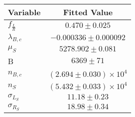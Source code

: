 \begin{tabular}[t]{lc}
\hline
Variable &Fitted Value\\
\hline\hline
$f_{\frac{L}{R}}$&$0.470\pm0.025$\\
\hline
$\lambda_{B,c}$&$-0.000336\pm0.000092$\\
\hline
$\mu_S$&$5278.902\pm0.081$\\
\hline
B&$6369\pm71$\\
\hline
$n_{B,c}$&$(2.694\pm0.030)\times 10^4$\\
\hline
$n_S$&$(5.432\pm0.033)\times 10^4$\\
\hline
$\sigma_{L_S}$&$11.18\pm0.23$\\
\hline
$\sigma_{R_S}$&$18.98\pm0.34$\\
\hline
\end{tabular}